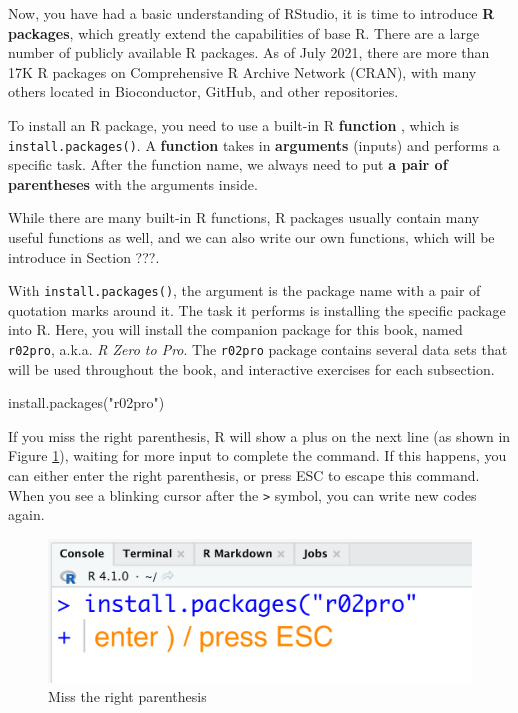 \documentclass[
]{book}
\newenvironment{Shaded}{\begin{snugshade}}{\end{snugshade}}
\newcommand{\FunctionTok}[1]{\textcolor[rgb]{0.00,0.00,0.00}{#1}}
\newcommand{\NormalTok}[1]{#1}
\newcommand{\StringTok}[1]{\textcolor[rgb]{0.31,0.60,0.02}{#1}}
\newenvironment{infobox}[1]
  {
  \begin{itemize}
  \renewcommand{\labelitemi}{
    \raisebox{-.7\height}[0pt][0pt]{
      {\setkeys{Gin}{width=3em,keepaspectratio}
        \texttt{[image: pics/\#1]}}
    }
  }
  \setlength{\fboxsep}{1em}
  \begin{blackbox}
  \item
  }
  {
  \end{blackbox}
  \end{itemize}
  }
\newenvironment{blackbox}{
  \definecolor{shadecolor}{rgb}{0, 0, 0}  %
  \color{white}
  \begin{shaded}}
 {\end{shaded}}
\begin{document}
Now, you have had a basic understanding of RStudio, it is time to introduce \textbf{R packages}, which greatly extend the capabilities of base R. There are a large number of publicly available R packages. As of July 2021, there are more than 17K R packages on Comprehensive R Archive Network (CRAN), with many others located in Bioconductor, GitHub, and other repositories.

To install an R package, you need to use a built-in R \textbf{function} , which is \texttt{install.packages()}. A \textbf{function} takes in \textbf{arguments} (inputs) and performs a specific task. After the function name, we always need to put \textbf{a pair of parentheses} with the arguments inside.

While there are many built-in R functions, R packages usually contain many useful functions as well, and we can also write our own functions, which will be introduce in Section ???.

With \texttt{install.packages()}, the argument is the package name with a pair of quotation marks around it. The task it performs is installing the specific package into R. Here, you will install the companion package for this book, named \texttt{r02pro}, a.k.a. \emph{R Zero to Pro}. The \texttt{r02pro} package contains several data sets that will be used throughout the book, and interactive exercises for each subsection.

\begin{Shaded}
\begin{Highlighting}[]
\FunctionTok{install.packages}\NormalTok{(}\StringTok{"r02pro"}\NormalTok{)}
\end{Highlighting}
\end{Shaded}

\begin{infobox}{caution}
If you miss the right parenthesis, R will show a plus on the next line (as shown in Figure \ref{fig:right1}), waiting for more input to complete the command. If this happens, you can either enter the right parenthesis, or press ESC to escape this command. When you see a blinking cursor after the \texttt{\textgreater{}} symbol, you can write new codes again.

\end{infobox}

\begin{figure}

{\centering \includegraphics[width=0.7\linewidth]{pics/1right} 

}

\caption{Miss the right parenthesis}\label{fig:right1}
\end{figure}
\end{document}
